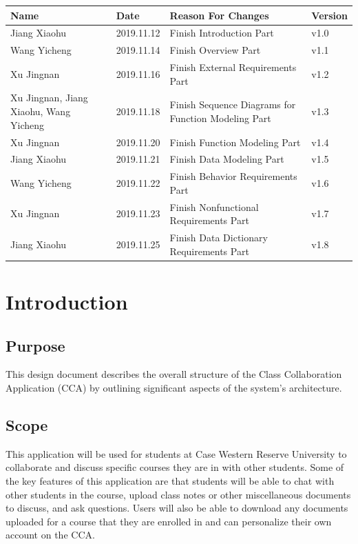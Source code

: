 \documentclass[16pt]{scrreprt}
\begin{document}
\begin{center}
    \begin{tabular}{|p{5cm}|p{3cm}|p{7cm}|p{2cm}|}
        \hline
	    Name & Date & Reason For Changes & Version\\
        \hline
	    Jiang Xiaohu & 2019.11.12 & Finish Introduction Part  & v1.0\\
        \hline
	    Wang Yicheng & 2019.11.14 & Finish Overview Part & v1.1\\
        \hline
        Xu Jingnan & 2019.11.16 & Finish External Requirements Part & v1.2\\
        \hline
        Xu Jingnan, Jiang Xiaohu, Wang Yicheng & 2019.11.18 & Finish Sequence Diagrams for Function Modeling Part& v1.3\\
        \hline
        Xu Jingnan & 2019.11.20 & Finish Function Modeling Part & v1.4\\
        \hline
        Jiang Xiaohu & 2019.11.21 & Finish Data Modeling Part  & v1.5\\
        \hline
        Wang Yicheng & 2019.11.22 & Finish Behavior Requirements Part & v1.6\\
        \hline
        Xu Jingnan & 2019.11.23 & Finish Nonfunctional Requirements Part & v1.7\\
        \hline
        Jiang Xiaohu & 2019.11.25 & Finish Data Dictionary Requirements Part & v1.8\\
        \hline
    \end{tabular}
\end{center}

\chapter{Introduction}

\section{Purpose}
This design document describes the overall structure of the Class Collaboration Application (CCA) by outlining significant aspects of the system’s architecture.


\section{Scope}
This application will be used for students at Case Western Reserve University to collaborate and discuss specific courses they are in with other students. Some of the key features of this application are that students will be able to chat with other students in the course, upload class notes or other miscellaneous documents to discuss, and ask questions. Users will also be able to download any documents uploaded for a course that they are enrolled in and can personalize their own account on the CCA. 
\end{document}
